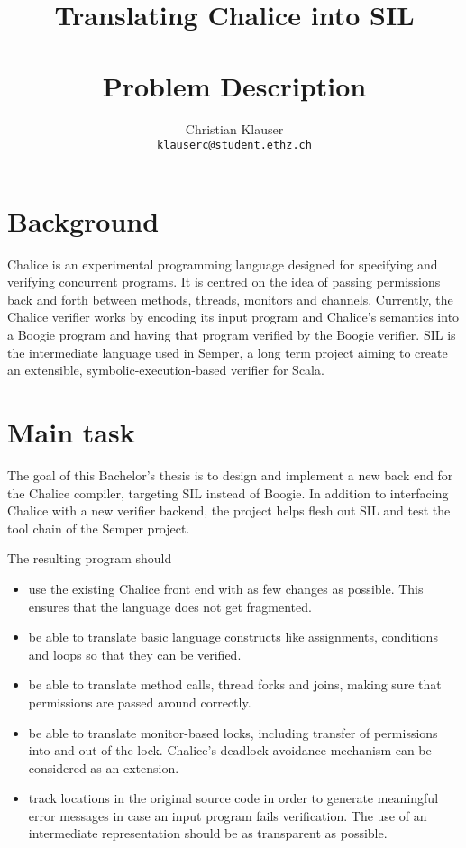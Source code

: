 \documentclass[11pt]{article} %
\title{{\Huge Translating Chalice into SIL}\\{\small\ }\\{\huge Problem Description}}
\author{Christian Klauser\\ \texttt{klauserc@student.ethz.ch}}
\begin{document}
\maketitle

\section{Background}
Chalice is an experimental programming language designed for specifying and verifying concurrent programs. It is centred on the idea of passing permissions back and forth between methods, threads, monitors and channels. Currently, the Chalice verifier works by encoding its input program and Chalice's semantics into a Boogie program and having that program verified by the Boogie verifier. 
SIL is the intermediate language used in Semper, a long term project aiming to create an extensible, symbolic-execution-based verifier for Scala.

\section{Main task}
The goal of this Bachelor's thesis is to design and implement a new back end for the Chalice compiler, targeting SIL instead of Boogie. In addition to interfacing Chalice with a new verifier backend, the project helps flesh out SIL and test the tool chain of the Semper project.

The resulting program should
\begin{itemize}
\item use the existing Chalice front end with as few changes as possible. This ensures that the language does not get fragmented.
\item be able to translate basic language constructs like assignments, conditions and loops so that they can be verified.
\item be able to translate method calls, thread forks and joins, making sure that permissions are passed around correctly.
\item be able to translate monitor-based locks, including transfer of permissions into and out of the lock. Chalice's deadlock-avoidance mechanism can be considered as an extension.
\item track locations in the original source code in order to generate meaningful error messages in case an input program fails verification. The use of an intermediate representation should be as transparent as possible.
\end{itemize}
\end{document}
